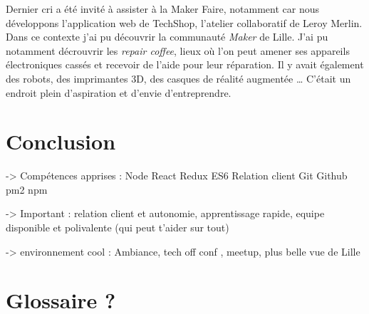 Dernier cri a été invité à assister à la Maker Faire, notamment car nous
développons l'application web de TechShop, l'atelier collaboratif de
Leroy Merlin. Dans ce contexte j'ai pu découvrir la communauté
\emph{Maker} de Lille. J'ai pu notamment décrouvrir les \emph{repair
coffee}, lieux où l'on peut amener ses appareils électroniques cassés et
recevoir de l'aide pour leur réparation. Il y avait également des
robots, des imprimantes 3D, des casques de réalité augmentée \ldots{}
C'était un endroit plein d'aspiration et d'envie d'entreprendre.

\newpage

\section{Conclusion}\label{conclusion-2}

-\textgreater{} Compétences apprises : Node React Redux ES6 Relation
client Git Github pm2 npm

-\textgreater{} Important : relation client et autonomie, apprentissage
rapide, equipe disponible et polivalente (qui peut t'aider sur tout)

-\textgreater{} environnement cool : Ambiance, tech off conf , meetup,
plus belle vue de Lille

\newpage

\section{Glossaire ?}\label{glossaire}
